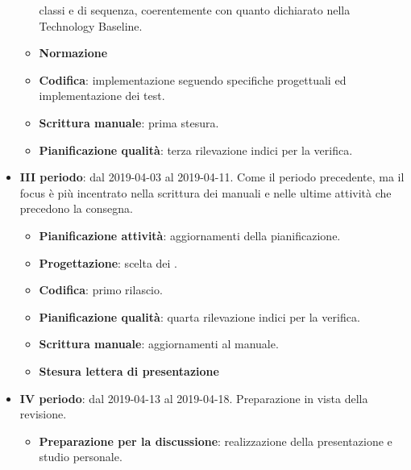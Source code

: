 \begin{itemize}
\begin{itemize}
				classi e di sequenza, coerentemente con quanto dichiarato nella Technology Baseline.
    	        \item \textbf{Normazione}
    	        \item \textbf{Codifica}: implementazione seguendo specifiche progettuali ed implementazione dei test.
    	        \item \textbf{Scrittura manuale}: prima stesura.
                \item \textbf{Pianificazione qualità}: terza rilevazione indici per la verifica.
        	\end{itemize}
        	\item \textbf{III periodo}: dal 2019-04-03 al 2019-04-11. Come il periodo precedente, ma il focus è più incentrato nella
				scrittura dei manuali e nelle ultime attività che precedono la consegna.
			\begin{itemize}
				\item \textbf{Pianificazione attività}: aggiornamenti della pianificazione.
    	        \item \textbf{Progettazione}: scelta dei .
    	        \item \textbf{Codifica}: primo rilascio.
    	        \item \textbf{Pianificazione qualità}: quarta rilevazione indici per la verifica.
    	        \item \textbf{Scrittura manuale}: aggiornamenti al manuale.
    	        \item \textbf{Stesura lettera di presentazione}
        	\end{itemize}
        	\item \textbf{IV periodo}: dal 2019-04-13 al 2019-04-18. Preparazione in vista della revisione.
			\begin{itemize}
				\item \textbf{Preparazione per la discussione}: realizzazione della presentazione e studio personale.
        	\end{itemize}
        \end{itemize}

